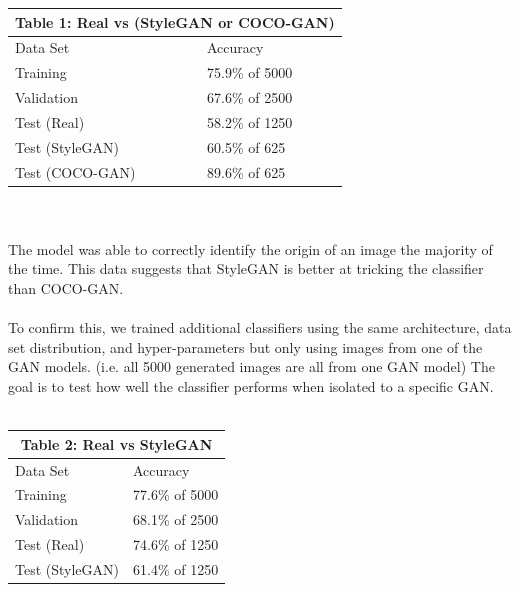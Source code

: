 \documentclass[12pt]{article}
\begin{document}
\begin{multicols*}{2}
        \begin{tabular}{ |p{4cm}|p{3cm}|  }
         \hline
         \multicolumn{2}{|c|}{Table 1: Real vs (StyleGAN or COCO-GAN)} \\
         \hline
        Data Set     & Accuracy\\
         \hline
        Training        & 75.9\% of 5000 \\
         \hline
        Validation      & 67.6\% of 2500 \\
         \hline
        Test (Real)     & 58.2\% of 1250 \\
         \hline
        Test (StyleGAN) & 60.5\% of 625  \\
         \hline
        Test (COCO-GAN) & 89.6\% of 625 \\
         \hline
        \end{tabular}
        \\\\
        The model was able to correctly identify the origin of an image the majority of the time.
        This data suggests that StyleGAN is better at tricking the classifier than COCO-GAN.
        \\\\
        To confirm this, we trained additional classifiers using the same architecture, data set distribution, and hyper-parameters but only using images from one of the GAN models.
        (i.e. all 5000 generated images are all from one GAN model)
        The goal is to test how well the classifier performs when isolated to a specific GAN.\\\\
        \begin{tabular}{ |p{4cm}|p{3cm}|  }
             \hline
             \multicolumn{2}{|c|}{Table 2: Real vs StyleGAN} \\
             \hline
            Data Set     & Accuracy\\
             \hline
            Training        & 77.6\% of 5000 \\
             \hline
            Validation      & 68.1\% of 2500 \\
             \hline
            Test (Real)     & 74.6\% of 1250 \\
             \hline
            Test (StyleGAN) & 61.4\% of 1250  \\
             \hline
        \end{tabular}
        \begin{tabular}{ |p{4cm}|p{3cm}|  }
             \hline

\end{tabular}
\end{multicols*}
\end{document}
